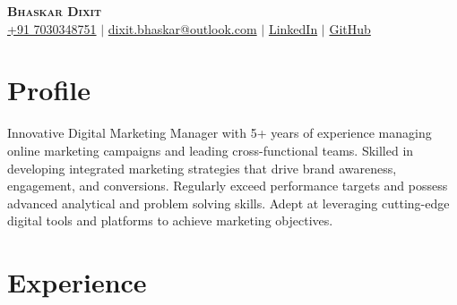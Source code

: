 \documentclass{resume}
\begin{document}

\begin{center}
    \textbf{\Huge \scshape Bhaskar Dixit} \\ \vspace{3pt}
    \small
    \faMobile \hspace{.5pt} \href{tel:917030348751}{+91 7030348751}
    $|$
    \faAt \hspace{.5pt} \href{mailto:dixit.bhaskar@outlook.com}{dixit.bhaskar@outlook.com}
    $|$
    \faLinkedinSquare \hspace{.5pt} \href{https://www.linkedin.com/in/bhaskar-dixit}{LinkedIn}
    $|$
    \faGithub \hspace{.5pt} \href{https://github.com/devBhaskar98}{GitHub}
\end{center}


\section{Profile}
{Innovative Digital Marketing Manager with 5+ years of experience managing online marketing campaigns and leading cross-functional teams. Skilled in developing integrated marketing strategies that drive brand awareness, engagement, and conversions. Regularly exceed performance targets and possess advanced analytical and problem solving skills. Adept at leveraging cutting-edge digital tools and platforms to achieve marketing objectives.}


\section{Experience}
  \vspace{3pt}
  \resumeSubHeadingListStart
\end{document}
